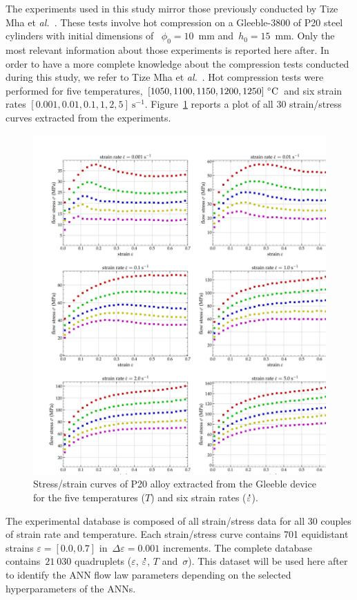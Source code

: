 \documentclass[algorithms,article,submit,pdftex,oneauthors]{Definitions/mdpi}
\makeatletter
\DeclareRobustCommand{\mdot}[1]{\accentset{\mbox{\bfseries .}}{#1}}
\DeclareRobustCommand{\eal}{et \emph{al.}\@\xspace}
\DeclareRobustCommand{\ps}{\text{s}^{-1}}
\makeatother
\begin{document}
The experiments used in this study mirror those previously conducted by Tize Mha \eal~\cite{Tize-2023-IEP}.
These tests involve hot compression on a Gleeble-3800 of P20 steel cylinders with initial dimensions of ~$\phi_{0}=10$~mm and~$h_{0}=15$~mm.
Only the most relevant information about those experiments is reported here after.
In order to have a more complete knowledge about the compression tests conducted during this study, we refer to Tize Mha \eal~\cite{Tize-2023-IEP}.
Hot compression tests were performed for five temperatures, $[1050,1100,1150,1200,1250]~\celsius$ and six strain rates $[0.001,0.01,0.1,1,2,5]~\ps$.
Figure~\ref{fig:RawData} reports a plot of all 30 strain/stress curves extracted from the experiments.
\begin{figure}[h!]
\centering
\includegraphics[width=0.9\columnwidth]{Figures/3Cr2Mo-raw}
\caption{Stress/strain curves of P20 alloy extracted from the Gleeble device for the five temperatures ($T$) and six strain rates ($\mdot{\varepsilon}$).}
\label{fig:RawData}
\end{figure}
The experimental database is composed of all strain/stress data for all 30 couples of strain rate and temperature.
Each strain/stress curve contains 701 equidistant strains $\varepsilon=[0.0,0.7]$ in~$\Delta\varepsilon=0.001$ increments.
The complete database contains~$21~030$ quadruplets ($\varepsilon$, $\mdot{\varepsilon}$, $T$ and~$\sigma$).
This dataset will be used here after to identify the ANN flow law parameters depending on the selected hyperparameters of the ANNs.
\end{document}
